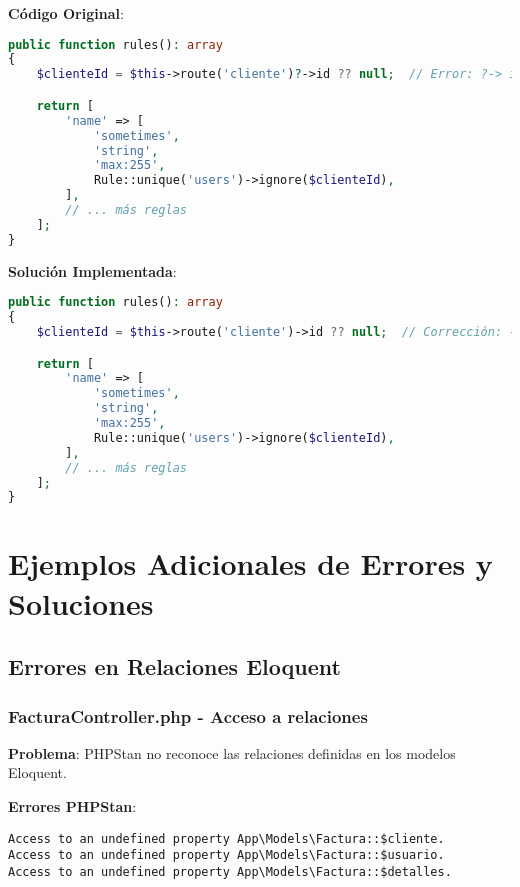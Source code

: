\documentclass[12pt,a4paper]{article}
\begin{document}
\textbf{Código Original}:
\begin{lstlisting}[language=php, caption=UpdateClienteRequest.php - Operador nullsafe innecesario]
public function rules(): array
{
    $clienteId = $this->route('cliente')?->id ?? null;  // Error: ?-> innecesario

    return [
        'name' => [
            'sometimes',
            'string',
            'max:255',
            Rule::unique('users')->ignore($clienteId),
        ],
        // ... más reglas
    ];
}
\end{lstlisting}

\textbf{Solución Implementada}:
\begin{lstlisting}[language=php, caption=UpdateClienteRequest.php - Corrección]
public function rules(): array
{
    $clienteId = $this->route('cliente')->id ?? null;  // Corrección: -> en lugar de ?->

    return [
        'name' => [
            'sometimes',
            'string',
            'max:255',
            Rule::unique('users')->ignore($clienteId),
        ],
        // ... más reglas
    ];
}
\end{lstlisting}\section{Ejemplos Adicionales de Errores y Soluciones}

\subsection{Errores en Relaciones Eloquent}

\subsubsection{FacturaController.php - Acceso a relaciones}

\textbf{Problema}: PHPStan no reconoce las relaciones definidas en los modelos Eloquent.

\textbf{Errores PHPStan}:
\begin{lstlisting}[caption=Errores de relaciones en FacturaController]
Access to an undefined property App\Models\Factura::$cliente.
Access to an undefined property App\Models\Factura::$usuario.
Access to an undefined property App\Models\Factura::$detalles.
\end{lstlisting}
\end{document}
